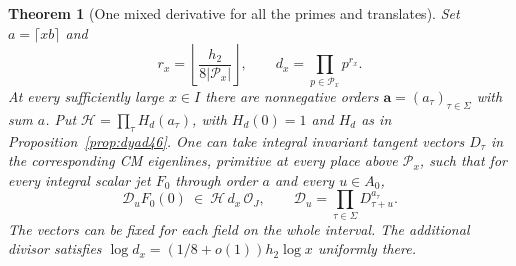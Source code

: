 \documentclass[a4paper,11pt]{article}
\newtheorem{theorem}[proposition]{Theorem}
\theoremstyle{definition}
\theoremstyle{remark}
\numberwithin{equation}{section}
\begin{document}
\begin{theorem}[One mixed derivative for all the primes and translates]\label{thm:sim53}
Set \(a=\lceil xb\rceil\) and
\[
      r_x=\left\lfloor\frac{h_2}{8|\mathcal P_x|}\right\rfloor,
      \qquad d_x=\prod_{p\in\mathcal P_x}p^{r_x}.
\]
At every sufficiently large \(x\in I\) there are nonnegative orders
\(\boldsymbol a=(a_\tau)_{\tau\in\Sigma}\) with sum \(a\).
Put \(\mathcal H=\prod_\tau H_d(a_\tau)\), with \(H_d(0)=1\) and
\(H_d\) as in Proposition~\ref{prop:dyad46}. One can take integral
invariant tangent vectors \(D_\tau\) in the corresponding CM
eigenlines, primitive at every place above \(\mathcal P_x\), such
that for every integral scalar jet \(F_0\) through order \(a\) and
every \(u\in A_0\),
\begin{equation}
    \mathcal D_u F_0(0)\ \in\ \mathcal H\,d_x\,\mathcal O_J,
       \qquad \mathcal D_u=\prod_{\tau\in\Sigma}D_{\tau+u}^{a_\tau}.
                                                               \label{eq:whole53}
\end{equation}
The vectors can be fixed for each field on the whole interval.
The additional divisor satisfies
\(\log d_x=(1/8+o(1))h_2\log x\) uniformly there.
\end{theorem}
\end{document}
